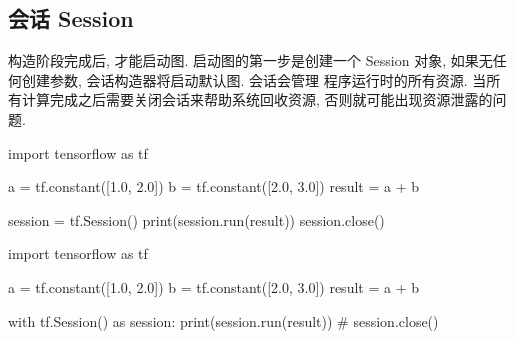 \subsection{会话 Session}
\begin{frame}[fragile]{\insertsection}{\insertsubsection}
构造阶段完成后, 才能启动图. 启动图的第一步是创建一个 Session 对象, 如果无任何创建参数, 会话构造器将启动默认图. 会话会管理 \tensorflow{} 程序运行时的所有资源. 当所有计算完成之后需要关闭会话来帮助系统回收资源, 否则就可能出现资源泄露的问题. \vspace{10pt}

\begin{minipage}[t]{0.48\textwidth}
\begin{pythoncode}
import tensorflow as tf

a = tf.constant([1.0, 2.0])
b = tf.constant([2.0, 3.0])
result = a + b

session = tf.Session()
print(session.run(result))
session.close()
\end{pythoncode}
\end{minipage}%
\hfill%
\begin{minipage}[t]{0.48\textwidth}
\begin{pythoncode}
import tensorflow as tf

a = tf.constant([1.0, 2.0])
b = tf.constant([2.0, 3.0])
result = a + b

with tf.Session() as session:
    print(session.run(result))
# session.close()
\end{pythoncode}
\end{minipage}
\end{frame}